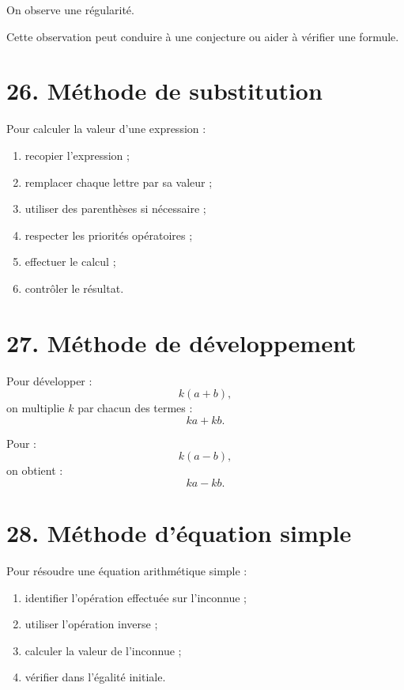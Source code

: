 On observe une régularité.

Cette observation peut conduire à une conjecture ou aider à vérifier une formule.

\section{26. Méthode de substitution}

\begin{methode}
Pour calculer la valeur d'une expression :
\begin{enumerate}
\item recopier l'expression ;
\item remplacer chaque lettre par sa valeur ;
\item utiliser des parenthèses si nécessaire ;
\item respecter les priorités opératoires ;
\item effectuer le calcul ;
\item contrôler le résultat.
\end{enumerate}
\end{methode}

\section{27. Méthode de développement}

\begin{methode}
Pour développer :
\[
k(a+b),
\]
on multiplie $k$ par chacun des termes :
\[
ka+kb.
\]

Pour :
\[
k(a-b),
\]
on obtient :
\[
ka-kb.
\]
\end{methode}

\section{28. Méthode d'équation simple}

\begin{methode}
Pour résoudre une équation arithmétique simple :
\begin{enumerate}
\item identifier l'opération effectuée sur l'inconnue ;
\item utiliser l'opération inverse ;
\item calculer la valeur de l'inconnue ;
\item vérifier dans l'égalité initiale.
\end{enumerate}
\end{methode}

